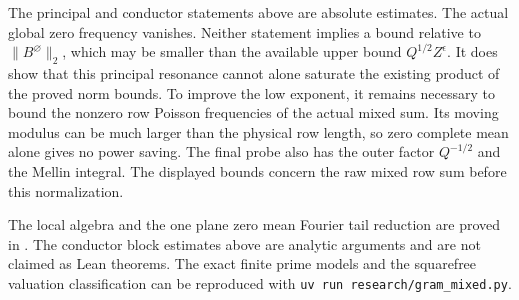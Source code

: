 \documentclass[11pt]{article}
\begin{document}
The principal and conductor statements above are absolute estimates.
The actual global zero frequency vanishes. Neither statement implies a bound relative
to $\|B^\varnothing\|_2$, which may be smaller than the available upper
bound $Q^{1/2}Z^\epsilon$. It does show that this principal resonance
cannot alone saturate the existing product of the proved norm bounds.
To improve the low exponent, it remains necessary to bound the nonzero
row Poisson frequencies of the actual mixed sum. Its moving modulus can
be much larger than the physical row length, so zero complete mean
alone gives no power saving. The final probe also has the outer factor
$Q^{-1/2}$ and the Mellin integral. The displayed bounds concern the raw
mixed row sum before this normalization.

The local algebra and the one plane zero mean Fourier tail reduction
are proved in .
The conductor block estimates above are analytic arguments and are not
claimed as Lean theorems.
The exact finite prime models and the squarefree valuation classification
can be reproduced with
\texttt{uv run research/gram\_mixed.py}.
\end{document}
